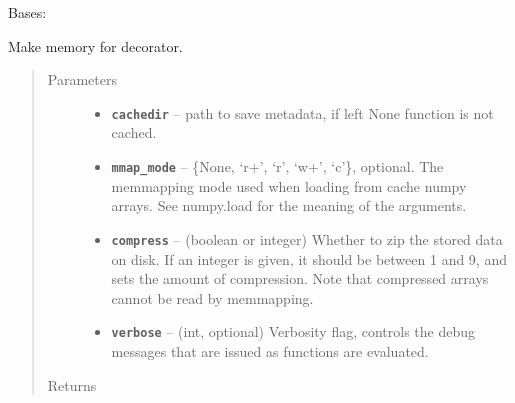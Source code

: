 \documentclass[letterpaper,10pt,english]{sphinxmanual}
\begin{document}
\begin{fulllineitems}
\label{RRtoolbox.lib:RRtoolbox.lib.cache.Memoizer}
Bases: 

\begin{fulllineitems}
\label{RRtoolbox.lib:RRtoolbox.lib.cache.Memoizer.ignore}
\end{fulllineitems}


\begin{fulllineitems}
\label{RRtoolbox.lib:RRtoolbox.lib.cache.Memoizer.makememory}
Make memory for {\hyperref[RRtoolbox.lib:RRtoolbox.lib.cache.Memoizer.memoize]{\emph{}}} decorator.
\begin{quote}\begin{description}
\item[{Parameters}] \leavevmode\begin{itemize}
\item {} 
\textbf{\texttt{cachedir}} -- path to save metadata, if left None function is not cached.

\item {} 
\textbf{\texttt{mmap\_mode}} -- \{None, `r+', `r', `w+', `c'\}, optional.
The memmapping mode used when loading from cache
numpy arrays. See numpy.load for the meaning of the
arguments.

\item {} 
\textbf{\texttt{compress}} -- (boolean or integer)
Whether to zip the stored data on disk. If an integer is
given, it should be between 1 and 9, and sets the amount
of compression. Note that compressed arrays cannot be
read by memmapping.

\item {} 
\textbf{\texttt{verbose}} -- (int, optional)
Verbosity flag, controls the debug messages that are issued
as functions are evaluated.

\end{itemize}

\item[{Returns}] \leavevmode


\end{description}\end{quote}


\end{fulllineitems}
\end{fulllineitems}
\end{document}
